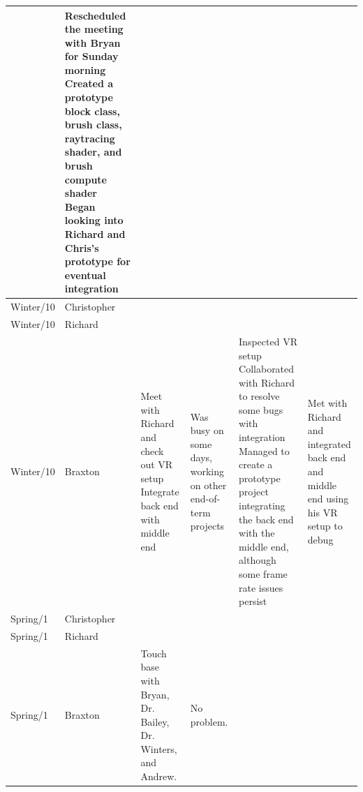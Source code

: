 \documentclass[onecolumn, draftclsnofoot,10pt, compsoc]{IEEEtran}
\begin{document}
\begin{tiny}
\begin{longtable}{ | p{} | p{} | p{} | p{} | p{} | p{} | }
&

Rescheduled the meeting with Bryan for Sunday morning \newline
Created a prototype block class, brush class, raytracing shader, and brush compute shader \newline
Began looking into Richard and Chris's prototype for eventual integration 

\\ \hline
Winter/10 & Christopher & 

&

&

&

\\ \hline
Winter/10 & Richard & 

&

&

&

\\ \hline
Winter/10 & Braxton & 

Meet with Richard and check out VR setup \newline
Integrate back end with middle end 

&

Was busy on some days, working on other end-of-term projects 

&

Inspected VR setup 
Collaborated with Richard to resolve some bugs with integration 
Managed to create a prototype project integrating the back end with the middle end, although some frame rate issues persist 

&

Met with Richard and integrated back end and middle end using his VR setup to debug 

\\ \hline
Spring/1 & Christopher & 

&

&

&

\\ \hline
Spring/1 & Richard & 

&

&

&

\\ \hline
Spring/1 & Braxton & 

Touch base with Bryan, Dr. Bailey, Dr. Winters, and Andrew. 

&

No problem.

&


\end{longtable}
\end{tiny}
\end{document}
